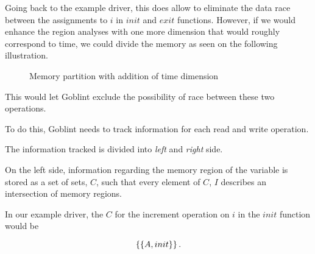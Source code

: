 \documentclass[..thesis.tex]{subfiles}
\newcommand{\opacity}{0.8}
\newcommand{\drawcube}[7]
{
      \filldraw[opacity=\opacity, #7, draw=black, dashed, xzp=#2] (#1,#3) rectangle (#4,#6);
      \filldraw[opacity=\opacity, #7, draw=black, dashed, xzp=#5] (#1,#3) rectangle (#4,#6);
      \filldraw[opacity=\opacity, #7, draw=black, dashed, xyp=#3] (#1,#2) rectangle (#4,#5);
      \filldraw[opacity=\opacity, #7, draw=black, dashed, xyp=#6] (#1,#2) rectangle (#4,#5);
      \filldraw[opacity=\opacity, #7, draw=black, dashed, yzp=#4] (#2,#3) rectangle (#5,#6);
}
\newcommand{\drawcubeoverz}[5]
{
 \drawcube{#1}{#2}{0}{#3}{#4}{\cubez}{#5}
}
\newcommand{\drawoutercube}
{
      \draw[thick,-] (0,0,0) -- ++(\cubex,0,0) -- ++(0,0,\cubez) -- node [anchor = north] {$B$} ++(-0.5*\cubex,0,0) --  node [anchor = north] {$A$} ++(-0.5*\cubex,0,0)  --   ++(0,0,-\cubez);
      \draw[thick,-] (0,\cubey,0) -- ++(\cubex,0,0) -- ++(0,0,\cubez) -- ++(-\cubex,0,0) --   ++(0,0,-\cubez)  ;

      \draw[thick,-] (0,0,0) -- (0,\cubey,0);
      \draw[thick,-] (\cubex,0,0) -- (\cubex,\cubey,0);
      \draw[thick,-] (\cubex,0,\cubez) -- ++(0,\cubey,0);
      \draw[thick,-] (0,0,\cubez) -- (0,\cubey,\cubez);
}
\newcommand{\initColor}{red}
\newcommand{\initLColor}{\initColor!30}
\newcommand{\initRColor}{\initColor!75}
\newcommand{\postInitColor}{blue}
\newcommand{\postInitLColor}{\postInitColor!30}
\newcommand{\postInitRColor}{\postInitColor!75}
\begin{document}
Going back to the example driver, this does allow to eliminate the data race between the assignments to $i$ in $init$ and $exit$ functions.
However, if we would enhance the region analyses with one more dimension that would roughly correspond to time,
we could divide the memory as seen on the following illustration. 

\begin{figure}[H]
  \centering
    \caption{Memory partition with addition of time dimension}
\end{figure}

This would let Goblint exclude the possibility of race between these two operations. 


To do this, Goblint needs to track information for each read and write operation.


The information tracked is divided into \textit{left} and \textit{right} side. 

On the left side, information regarding the memory region of the variable is stored as a set of sets, $C$,
 such that every element of $C$, $I$ describes an intersection of memory regions.

In our example driver, the $C$ for the increment operation on $i$ in the $init$ function would be 

\begin{equation*}
\left\lbrace \left\lbrace A, init \right\rbrace \right\rbrace \text{.}
\end{equation*} 
\end{document}
